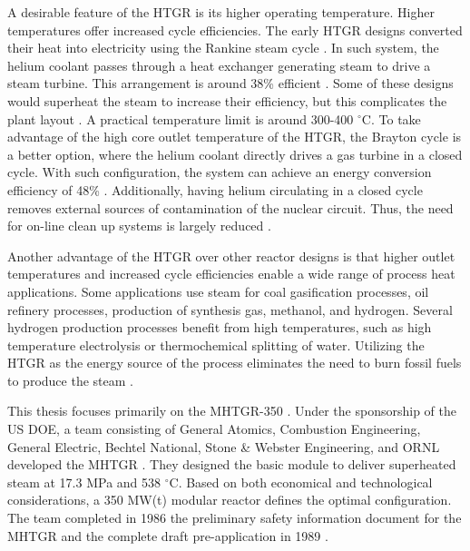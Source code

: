 \documentclass[11pt,letterpaper]{article}
\begin{document}
A desirable feature of the \gls{HTGR} is its higher operating temperature.
Higher temperatures offer increased cycle efficiencies.
The early \gls{HTGR} designs converted their heat into electricity using the Rankine steam cycle \cite{herranz_power_2009}.
In such system, the helium coolant passes through a heat exchanger generating steam to drive a steam turbine.
This arrangement is around 38\% efficient \cite{breeze_nuclear_2014}.
Some of these designs would superheat the steam to increase their efficiency, but this complicates the plant layout \cite{ballinger_balance_2004}.
A practical temperature limit is around 300-400 $^{\circ}$C.
To take advantage of the high core outlet temperature of the \gls{HTGR}, the Brayton cycle is a better option, where the helium coolant directly drives a gas turbine in a closed cycle.
With such configuration, the system can achieve an energy conversion efficiency of 48\% \cite{breeze_nuclear_2014}.
Additionally, having helium circulating in a closed cycle removes external sources of contamination of the nuclear circuit.
Thus, the need for on-line clean up systems is largely reduced \cite{iaea_current_2001}.

Another advantage of the \gls{HTGR} over other reactor designs is that higher outlet temperatures and increased cycle efficiencies enable a wide range of process heat applications.
Some applications use steam for coal gasification processes, oil refinery processes, production of synthesis gas, methanol, and hydrogen.
Several hydrogen production processes benefit from high temperatures, such as high temperature electrolysis or thermochemical splitting of water.
Utilizing the \gls{HTGR} as the energy source of the process eliminates the need to burn fossil fuels to produce the steam \cite{iaea_current_2001}.

This thesis focuses primarily on the \gls{MHTGR}-350 \cite{neylan_modular_1988} \cite{silady_licensing_1988}.
Under the sponsorship of the \gls{US} \gls{DOE}, a team consisting of General Atomics, Combustion Engineering, General Electric, Bechtel National, Stone \& Webster Engineering, and \gls{ORNL} developed the \gls{MHTGR} \cite{neylan_modular_1988}.
They designed the basic module to deliver superheated steam at 17.3 MPa and 538 $^{\circ}$C.
Based on both economical and technological considerations, a 350 MW(t) modular reactor defines the optimal configuration.
The team completed in 1986 the preliminary safety information document for the \gls{MHTGR} and the complete draft pre-application in 1989 \cite{huning_steady_2014}.
\end{document}
